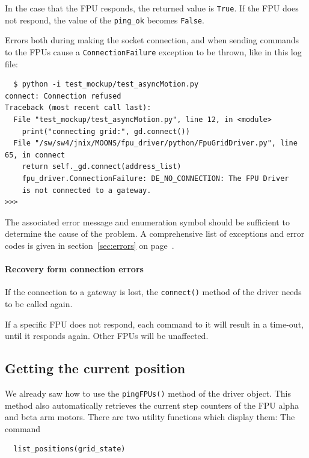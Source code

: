 \documentclass[11pt,a4paper]{scrartcl}
\begin{document}
In the case that the FPU responds, the returned value is
\texttt{True}.  If the FPU does not respond, the value of the
\verb+ping_ok+ becomes \texttt{False}.

Errors both during making the socket connection, and when sending
commands to the FPUs cause a \texttt{ConnectionFailure} exception to
be thrown, like in this log file:

\begin{verbatim}
  $ python -i test_mockup/test_asyncMotion.py 
connect: Connection refused
Traceback (most recent call last):
  File "test_mockup/test_asyncMotion.py", line 12, in <module>
    print("connecting grid:", gd.connect())
  File "/sw/sw4/jnix/MOONS/fpu_driver/python/FpuGridDriver.py", line 65, in connect
    return self._gd.connect(address_list)
    fpu_driver.ConnectionFailure: DE_NO_CONNECTION: The FPU Driver
    is not connected to a gateway.
>>> 
\end{verbatim}


The associated error message and enumeration symbol should be
sufficient to determine the cause of the problem. A comprehensive list
of exceptions and error codes is given in section~\ref{sec:errors} on
page~\pageref{sec:errors}.

\paragraph{Recovery form connection errors}
If the connection to a gateway is lost, the \texttt{connect()} method
of the driver needs to be called again.

If a specific FPU does not respond, each command to it will result in
a time-out, until it responds again. Other FPUs will be unaffected.



\subsection{Getting the current position}
   We already saw how to use
the \texttt{pingFPUs()} method of the driver object. This method also
automatically retrieves the current step counters of the FPU alpha and
beta arm motors.  There are two utility functions which display them:
The command

\begin{verbatim}
  list_positions(grid_state)
\end{verbatim}
\end{document}
